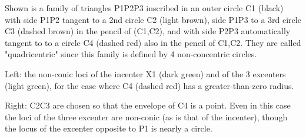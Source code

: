 Shown is a family of triangles P1P2P3 inscribed in an outer circle C1 (black) with side P1P2 tangent to a 2nd circle C2 (light brown), side P1P3 to a 3rd circle C3 (dashed brown) in the pencil of (C1,C2), and with side P2P3 automatically tangent to to a circle C4 (dashed red) also in the pencil of C1,C2. They are called "quadricentric" since this family is defined by 4 non-concentric circles.

Left: the non-conic loci of the incenter X1 (dark green) and of the 3 excenters (light green), for the case where C4 (dashed red) has a greater-than-zero radius.

Right: C2C3 are chosen so that the envelope of C4 is a point. Even in this case the loci of the three excenter are non-conic (as is that of the incenter), though the locus of the excenter opposite to P1 is nearly a circle.